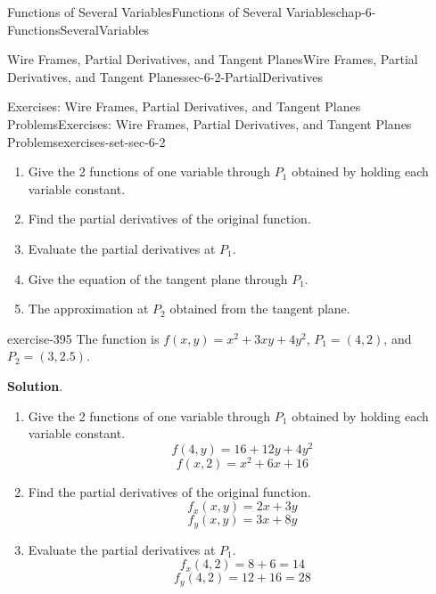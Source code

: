 \documentclass[oneside,10pt,]{book}
\numberwithin{equation}{section}
\begin{document}
\begin{chapterptx}{Functions of Several Variables}{}{Functions of Several Variables}{}{}{chap-6-FunctionsSeveralVariables}
\begin{sectionptx}{Wire Frames, Partial Derivatives, and Tangent Planes}{}{Wire Frames, Partial Derivatives, and Tangent Planes}{}{}{sec-6-2-PartialDerivatives}
\begin{exercises-subsection-numberless}{Exercises: Wire Frames, Partial Derivatives, and Tangent Planes Problems}{}{Exercises: Wire Frames, Partial Derivatives, and Tangent Planes Problems}{}{}{exercises-set-sec-6-2}
\leavevmode%
\begin{enumerate}[label=(\alph*)]
\item\hypertarget{li-612}{}\hypertarget{p-2243}{}%
Give the 2 functions of one variable through \(P_1\) obtained by holding each variable constant.%
\item\hypertarget{li-613}{}\hypertarget{p-2244}{}%
Find the partial derivatives of the original function.%
\item\hypertarget{li-614}{}\hypertarget{p-2245}{}%
Evaluate the partial derivatives at \(P_1\).%
\item\hypertarget{li-615}{}\hypertarget{p-2246}{}%
Give the equation of the tangent plane through \(P_1\).%
\item\hypertarget{li-616}{}\hypertarget{p-2247}{}%
The approximation at \(P_2\) obtained from the tangent plane.%
\end{enumerate}
\begin{exercisegroup}
\begin{divisionexerciseeg}{1}{}{}{exercise-395}%
\hypertarget{p-2248}{}%
The function is \(f(x,y)=x^2+3xy+4y^2\), \(P_1=(4,2)\), and \(P_2=(3,2.5)\).%
\par\smallskip%
\noindent\textbf{Solution}.\hypertarget{solution-199}{}\quad%
\leavevmode%
\begin{enumerate}[label=(\alph*)]
\item\hypertarget{li-617}{}\hypertarget{p-2249}{}%
Give the 2 functions of one variable through \(P_1\) obtained by holding each variable constant.%
%
\begin{equation*}
f(4,y)=16+12y+4y^2
\end{equation*}
%
\begin{equation*}
f(x,2)=x^2+6x+16
\end{equation*}
\item\hypertarget{li-618}{}\hypertarget{p-2250}{}%
Find the partial derivatives of the original function.%
%
\begin{equation*}
f_x  (x,y)=2x+3y
\end{equation*}
%
\begin{equation*}
f_y  (x,y)=3x+8y
\end{equation*}
\item\hypertarget{li-619}{}\hypertarget{p-2251}{}%
Evaluate the partial derivatives at \(P_1\).%
%
\begin{equation*}
f_x  (4,2)=8+6=14
\end{equation*}
%
\begin{equation*}
f_y  (4,2)=12+16=28
\end{equation*}

\end{enumerate}
\end{divisionexerciseeg}
\end{exercisegroup}
\end{exercises-subsection-numberless}
\end{sectionptx}
\end{chapterptx}
\end{document}

